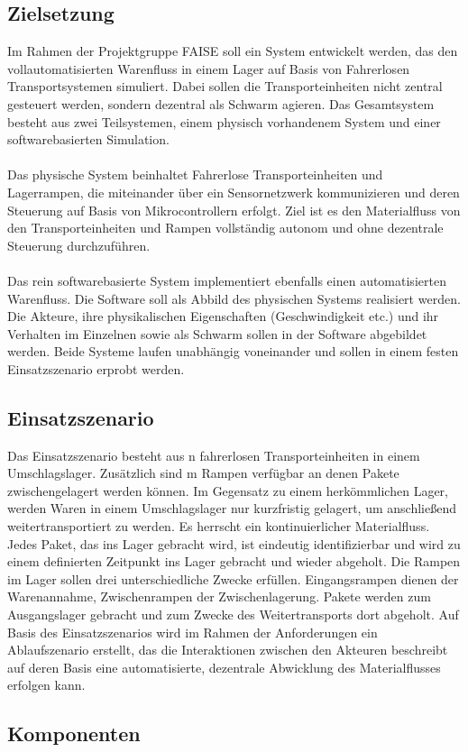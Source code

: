 \subsection{Zielsetzung}
Im Rahmen der Projektgruppe FAISE soll ein System entwickelt werden, das den vollautomatisierten Warenfluss in einem Lager auf Basis von Fahrerlosen Transportsystemen simuliert. Dabei sollen die Transporteinheiten nicht zentral gesteuert werden, sondern dezentral als Schwarm agieren.
Das Gesamtsystem besteht aus zwei Teilsystemen, einem physisch vorhandenem System und einer softwarebasierten Simulation. 
\\\\
Das physische System beinhaltet Fahrerlose Transporteinheiten und Lagerrampen, die miteinander über ein Sensornetzwerk kommunizieren und deren Steuerung auf Basis von Mikrocontrollern erfolgt. Ziel ist es den Materialfluss von den Transporteinheiten und Rampen vollständig autonom und ohne dezentrale Steuerung durchzuführen. 
\\\\
Das rein softwarebasierte System implementiert ebenfalls einen automatisierten Warenfluss. Die Software soll als Abbild des physischen Systems realisiert werden. Die Akteure, ihre physikalischen Eigenschaften (Geschwindigkeit etc.) und ihr Verhalten im Einzelnen sowie als Schwarm sollen in der Software abgebildet werden. Beide Systeme laufen unabhängig voneinander und sollen in einem festen Einsatzszenario erprobt werden.

\subsection{Einsatzszenario}
Das Einsatzszenario besteht aus n fahrerlosen Transporteinheiten in einem Umschlagslager. Zusätzlich sind m Rampen verfügbar an denen Pakete zwischengelagert werden können. Im Gegensatz zu einem herkömmlichen Lager, werden Waren in einem Umschlagslager nur kurzfristig gelagert, um anschließend weitertransportiert zu werden. Es herrscht ein kontinuierlicher Materialfluss. Jedes Paket, das ins Lager gebracht wird, ist eindeutig identifizierbar und wird zu einem definierten Zeitpunkt ins Lager gebracht und wieder abgeholt. Die Rampen im Lager sollen drei unterschiedliche Zwecke erfüllen. Eingangsrampen dienen der Warenannahme, Zwischenrampen der Zwischenlagerung. Pakete werden zum Ausgangslager gebracht und zum Zwecke des Weitertransports dort abgeholt. Auf Basis des Einsatzszenarios wird im Rahmen der Anforderungen ein Ablaufszenario erstellt, das die Interaktionen zwischen den Akteuren beschreibt auf deren Basis eine automatisierte, dezentrale Abwicklung des Materialflusses erfolgen kann.

\subsection{Komponenten}
  
